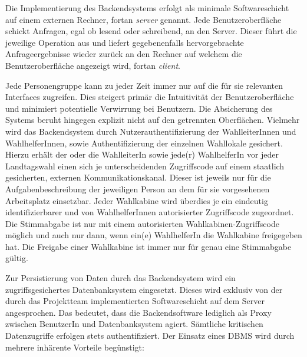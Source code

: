 \documentclass[a4paper,12pt]{article}
\begin{document}
Die Implementierung des Backendsystems erfolgt als minimale Softwareschicht auf einem externen 
Rechner, fortan \textit{server} genannt. Jede Benutzeroberfläche schickt Anfragen, egal ob lesend oder schreibend, 
an den Server. Dieser führt die jeweilige Operation aus und liefert gegebenenfalls hervorgebrachte
Anfrageergebnisse wieder zurück an den Rechner auf welchem die Benutzeroberfläche angezeigt wird, fortan \textit{client}.

Jede Personengruppe kann zu jeder Zeit immer nur auf die für sie relevanten Interfaces zugreifen.
Dies steigert primär die Intuitivität der Benutzeroberfläche und minimiert potentielle Verwirrung
bei Benutzern. Die Absicherung des Systems beruht hingegen explizit nicht auf den getrennten 
Oberflächen. Vielmehr wird das Backendsystem durch Nutzerauthentifizierung der WahlleiterInnen und 
WahlhelferInnen, sowie Authentifizierung der einzelnen Wahllokale gesichert. Hierzu erhält der oder die 
WahlleiterIn sowie jede(r) WahlhelferIn vor jeder Landtagswahl einen sich je unterscheidenden 
Zugriffscode auf einem staatlich gesicherten, externen Kommunikationskanal. Dieser
ist jeweils nur für die Aufgabenbeschreibung der jeweiligen Person an dem für sie vorgesehenen Arbeitsplatz einsetzbar. Jeder Wahlkabine wird überdies je ein eindeutig identifizierbarer und von WahlhelferInnen autorisierter Zugriffscode
zugeordnet. Die Stimmabgabe ist nur mit einem autorisierten Wahlkabinen-Zugriffscode möglich und auch
nur dann, wenn ein(e) WahlhelferIn die Wahlkabine freigegeben hat. Die Freigabe einer Wahlkabine
ist immer nur für genau eine Stimmabgabe gültig.

Zur Persistierung von Daten durch das Backendsystem wird ein zugriffsgesichertes Datenbanksystem eingesetzt. Dieses
wird exklusiv von der durch das Projektteam implementierten Softwareschicht auf dem Server angesprochen.
Das bedeutet, dass die Backendsoftware lediglich als Proxy zwischen BenutzerIn und Datenbanksystem agiert. Sämtliche 
kritischen Datenzugriffe erfolgen stets authentifiziert.
%
Der Einsatz eines DBMS wird durch mehrere inhärente Vorteile begünstigt:
\end{document}
